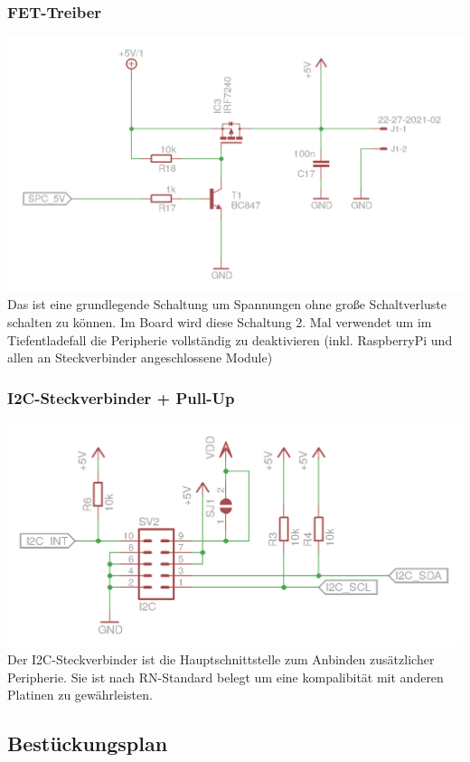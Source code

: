 \documentclass[a4paper,10pt]{article}
\begin{document}
\subsubsection{FET-Treiber}

\includegraphics[width=\textwidth]{circuit_fet} \\
Das ist eine grundlegende Schaltung um Spannungen ohne große Schaltverluste schalten zu können. Im Board wird diese Schaltung 2. Mal verwendet um im Tiefentladefall die Peripherie vollständig zu deaktivieren (inkl. RaspberryPi und allen an Steckverbinder angeschlossene Module)

\subsubsection{I2C-Steckverbinder + Pull-Up}

\includegraphics[width=\textwidth]{circuit_i2c-connector} \\
Der I2C-Steckverbinder ist die Hauptschnittstelle zum Anbinden zusätzlicher Peripherie. Sie ist nach RN-Standard belegt um eine kompalibität mit anderen Platinen zu gewährleisten.

\newpage
\subsection{Bestückungsplan}
\end{document}
